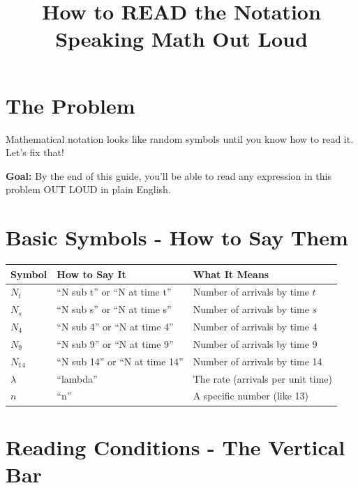 \documentclass[11pt]{article}
\title{\textbf{How to READ the Notation} \\ \large Speaking Math Out Loud}
\author{}
\date{}
\begin{document}
\maketitle

\section{The Problem}

Mathematical notation looks like random symbols until you know how to read it. Let's fix that!

\begin{tcolorbox}[colback=blue!10!white,colframe=blue!75!black]
\textbf{Goal:} By the end of this guide, you'll be able to read any expression in this problem OUT LOUD in plain English.
\end{tcolorbox}

\section{Basic Symbols - How to Say Them}

\begin{table}[h]
\centering
\begin{tabular}{|l|l|l|}
\hline
\textbf{Symbol} & \textbf{How to Say It} & \textbf{What It Means} \\
\hline
$N_t$ & ``N sub t'' or ``N at time t'' & Number of arrivals by time $t$ \\
\hline
$N_s$ & ``N sub s'' or ``N at time s'' & Number of arrivals by time $s$ \\
\hline
$N_4$ & ``N sub 4'' or ``N at time 4'' & Number of arrivals by time 4 \\
\hline
$N_9$ & ``N sub 9'' or ``N at time 9'' & Number of arrivals by time 9 \\
\hline
$N_{14}$ & ``N sub 14'' or ``N at time 14'' & Number of arrivals by time 14 \\
\hline
$\lambda$ & ``lambda'' & The rate (arrivals per unit time) \\
\hline
$n$ & ``n'' & A specific number (like 13) \\
\hline
\end{tabular}
\end{table}

\section{Reading Conditions - The Vertical Bar}
\end{document}
